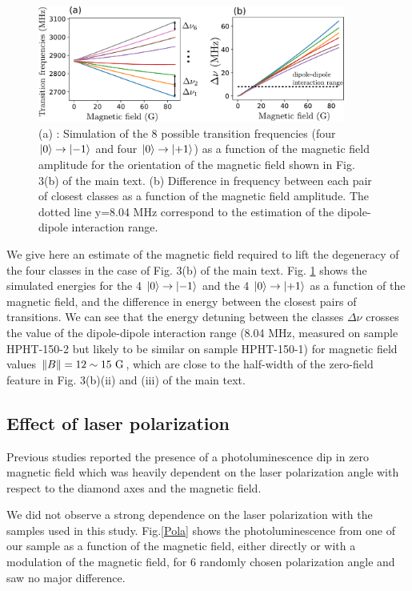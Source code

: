 \documentclass[preprintnumbers,amsmath,amssymb,onecolumn,12pt]{revtex4-2}\usepackage{graphicx}%
\begin{document}
\begin{figure}
\includegraphics[width=0.9\textwidth]{Figures_SI/Fig_splitting}
\caption{(a) : Simulation of the 8 possible transition frequencies (four $\ket{0} \to \ket{-1}$ and four $\ket{0} \to \ket{+1}$) as a function of the magnetic field amplitude for the orientation of the magnetic field shown in Fig. 3(b) of the main text. (b) Difference in frequency between each pair of closest classes as a function of the magnetic field amplitude. The dotted line y=8.04 MHz correspond to the estimation of the dipole-dipole interaction range.}
\label{splitting}
\end{figure}
We give here an estimate of the magnetic field required to lift the degeneracy of the four classes in the case of Fig. 3(b) of the main text. Fig. \ref{splitting} shows the simulated energies for the 4 $\ket{0} \to \ket{-1}$ and the 4 $\ket{0} \to \ket{+1}$ as a function of the magnetic field, and the difference in energy between the closest pairs of transitions. We can see that the energy detuning between the classes $\Delta \nu$ crosses the value of the dipole-dipole interaction range (8.04 MHz, measured on sample HPHT-150-2 but likely to be similar on sample HPHT-150-1) for magnetic field values $\norm{B} = 12 \sim 15\ \rm G$, which are close to the half-width of the zero-field feature in Fig. 3(b)(ii) and (iii) of the main text.

\subsection{Effect of laser polarization}
Previous studies \cite{anishchik2015low, filimonenko2020weak} reported the presence of a photoluminescence dip in zero magnetic field which was heavily dependent on the laser polarization angle with respect to the diamond axes and the magnetic field. 

We did not observe a strong dependence on the laser polarization with the samples used in this study. Fig.\ref{Pola} shows the photoluminescence from one of our sample as a function of the magnetic field, either directly or with a modulation of the magnetic field, for 6 randomly chosen polarization angle and saw no major difference. 
\end{document}
